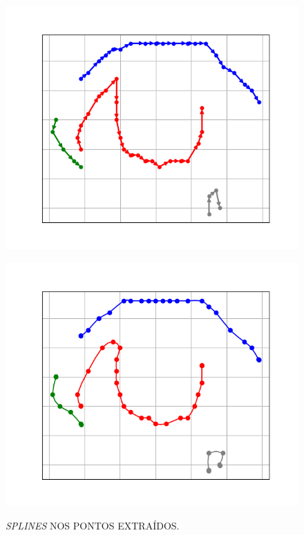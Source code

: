 \begin{figure}[h!]
    \caption{\textit{SPLINES} NOS PONTOS EXTRAÍDOS.}
    \centering
    \begin{minipage}[b]{0.45\textwidth}
        \centering
        \includegraphics[width=1\linewidth]{fig/07_sorted_points_right_eye.png}
        \label{fig:reordenacao}
    \end{minipage}
    \hfill
    \begin{minipage}[b]{0.45\textwidth}
        \centering
        \includegraphics[width=1\linewidth]{fig/08_spline_plot_right_eye.png}
        \label{fig:spline}
    \end{minipage}
\end{figure}





